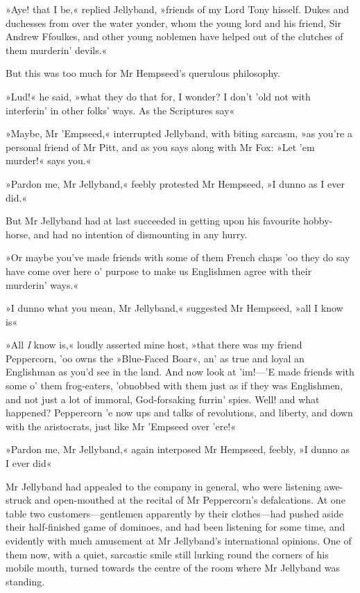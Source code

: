 »Aye! that I be,« replied Jellyband, »friends of my Lord Tony hisself. Dukes and duchesses from over the water yonder, whom the young lord and his friend, Sir Andrew Ffoulkes, and other young noblemen have helped out of the clutches of them murderin' devils.«

But this was too much for Mr Hempseed's querulous philosophy.

»Lud!« he said, »what they do that for, I wonder? I don't 'old not with interferin' in other folks' ways. As the Scriptures say\longdash«

»Maybe, Mr 'Empseed,« interrupted Jellyband, with biting sarcasm, »as you're a personal friend of Mr Pitt, and as you says along with Mr Fox: »Let 'em murder!« says you.«

»Pardon me, Mr Jellyband,« feebly protested Mr Hempseed, »I dunno as I ever did.«

But Mr Jellyband had at last succeeded in getting upon his favourite hobby-horse, and had no intention of dismounting in any hurry.

»Or maybe you've made friends with some of them French chaps 'oo they do say have come over here o' purpose to make us Englishmen agree with their murderin' ways.«

»I dunno what you mean, Mr Jellyband,« suggested Mr Hempseed, »all I know is\longdash«

»All \textit{I} know is,« loudly asserted mine host, »that there was my friend Peppercorn, 'oo owns the »Blue-Faced Boar«, an' as true and loyal an Englishman as you'd see in the land. And now look at 'im!—'E made friends with some o' them frog-eaters, 'obnobbed with them just as if they was Englishmen, and not just a lot of immoral, God-forsaking furrin' spies. Well! and what happened? Peppercorn 'e now ups and talks of revolutions, and liberty, and down with the aristocrats, just like Mr 'Empseed over 'ere!«

»Pardon me, Mr Jellyband,« again interposed Mr Hempseed, feebly, »I dunno as I ever did\longdash«

Mr Jellyband had appealed to the company in general, who were listening awe-struck and open-mouthed at the recital of Mr Peppercorn's defalcations. At one table two customers—gentlemen apparently by their clothes—had pushed aside their half-finished game of dominoes, and had been listening for some time, and evidently with much amusement at Mr Jellyband's international opinions. One of them now, with a quiet, sarcastic smile still lurking round the corners of his mobile mouth, turned towards the centre of the room where Mr Jellyband was standing.


